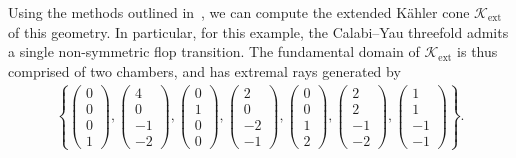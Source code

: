 \documentclass[11pt,dvipsnames]{article}
\theoremstyle{definition}
\begin{document}
Using the methods outlined in~\cite{Gendler:2022ztv}, we can compute the extended K\"ahler cone $\mathcal{K}_{\text{ext}}$ of this geometry. In particular, for this example, the Calabi--Yau threefold admits a single non-symmetric flop transition. The fundamental domain of $\mathcal{K}_{\text{ext}}$ is thus comprised of two chambers, and has extremal rays generated by
\begin{align}
    \left\{\begin{pmatrix} 0 \\ 0 \\ 0 \\ 1 \end{pmatrix} , \begin{pmatrix}
        4 \\ 0 \\ -1 \\ -2
    \end{pmatrix}, \begin{pmatrix}
        0 \\ 1 \\ 0 \\ 0
    \end{pmatrix}, \begin{pmatrix}
        2 \\0 \\-2 \\ -1
    \end{pmatrix}, \begin{pmatrix}
        0 \\ 0 \\ 1 \\ 2
    \end{pmatrix}, \begin{pmatrix}
        2 \\ 2 \\ -1 \\-2
    \end{pmatrix}, \begin{pmatrix}
        1 \\1 \\ -1 \\-1
    \end{pmatrix}\right\}.
\end{align}
\end{document}
